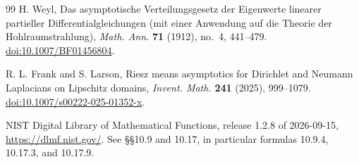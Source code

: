 \documentclass[11pt,reqno]{amsart}
\numberwithin{equation}{section}
\begin{document}
\begin{thebibliography}{99}
H. Weyl,
Das asymptotische Verteilungsgesetz der Eigenwerte linearer partieller
Differentialgleichungen (mit einer Anwendung auf die Theorie der Hohlraumstrahlung),
\emph{Math. Ann.} \textbf{71} (1912), no.~4, 441--479.
\href{https://doi.org/10.1007/BF01456804}{doi:10.1007/BF01456804}.

R. L. Frank and S. Larson,
Riesz means asymptotics for Dirichlet and Neumann Laplacians on Lipschitz domains,
\emph{Invent. Math.} \textbf{241} (2025), 999--1079.
\href{https://doi.org/10.1007/s00222-025-01352-x}{doi:10.1007/s00222-025-01352-x}.

NIST Digital Library of Mathematical Functions,
release 1.2.8 of 2026-09-15,
\url{https://dlmf.nist.gov/}.
See \S\S10.9 and 10.17, in particular formulas 10.9.4, 10.17.3, and 10.17.9.
\end{thebibliography}
\end{document}

